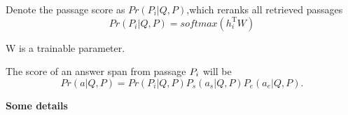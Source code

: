 \documentclass[sigconf]{acmart}
\begin{document}
\begin{enumerate}[(1)]
	Denote the passage score as $Pr(P_i|Q, P)$,which reranks all retrieved passages
		\begin{displaymath}
			Pr(P_i|Q, P) = softmax(h_i^\mathrm{ T }  W)
		\end{displaymath}
			
	W is a trainable parameter.
	
	The score of an answer span from passage $\MakeUppercase{p}_i$ will be
			\begin{displaymath}
			Pr(a| Q, P) = 	Pr(P_i|Q, P)P_s(a_s|Q, P)P_e(a_e|Q, P).
			\end{displaymath}
	
		
		
		
	\end{enumerate} 
   
   	\textbf{Some details}
   	
\end{document}
